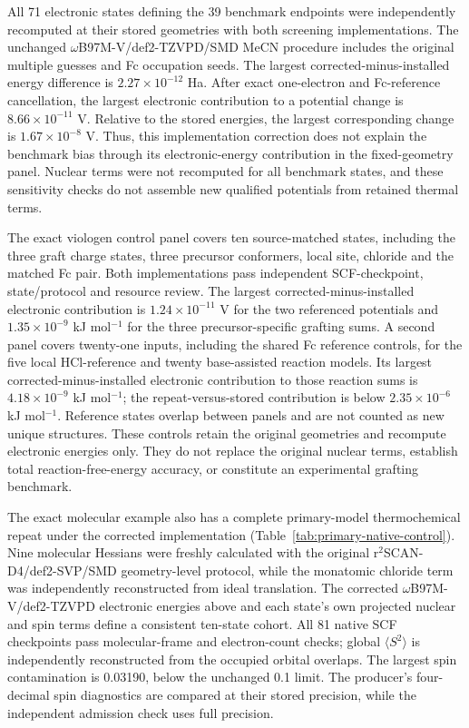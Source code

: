 \documentclass[11pt]{article}
\begin{document}
All 71 electronic states defining the 39 benchmark endpoints were independently recomputed at their stored geometries with both screening implementations. The unchanged $\omega$B97M-V/def2-TZVPD/SMD MeCN procedure includes the original multiple guesses and Fc occupation seeds. The largest corrected-minus-installed energy difference is $2.27\times10^{-12}$ Ha. After exact one-electron and Fc-reference cancellation, the largest electronic contribution to a potential change is $8.66\times10^{-11}$ V. Relative to the stored energies, the largest corresponding change is $1.67\times10^{-8}$ V. Thus, this implementation correction does not explain the benchmark bias through its electronic-energy contribution in the fixed-geometry panel. Nuclear terms were not recomputed for all benchmark states, and these sensitivity checks do not assemble new qualified potentials from retained thermal terms.

The exact viologen control panel covers ten source-matched states, including the three graft charge states, three precursor conformers, local site, chloride and the matched Fc pair. Both implementations pass independent SCF-checkpoint, state/protocol and resource review. The largest corrected-minus-installed electronic contribution is $1.24\times10^{-11}$ V for the two referenced potentials and $1.35\times10^{-9}$ kJ mol$^{-1}$ for the three precursor-specific grafting sums. A second panel covers twenty-one inputs, including the shared Fc reference controls, for the five local HCl-reference and twenty base-assisted reaction models. Its largest corrected-minus-installed electronic contribution to those reaction sums is $4.18\times10^{-9}$ kJ mol$^{-1}$; the repeat-versus-stored contribution is below $2.35\times10^{-6}$ kJ mol$^{-1}$. Reference states overlap between panels and are not counted as new unique structures. These controls retain the original geometries and recompute electronic energies only. They do not replace the original nuclear terms, establish total reaction-free-energy accuracy, or constitute an experimental grafting benchmark.

The exact molecular example also has a complete primary-model thermochemical repeat under the corrected implementation (Table~\ref{tab:primary-native-control}). Nine molecular Hessians were freshly calculated with the original r$^2$SCAN-D4/def2-SVP/SMD geometry-level protocol, while the monatomic chloride term was independently reconstructed from ideal translation. The corrected $\omega$B97M-V/def2-TZVPD electronic energies above and each state's own projected nuclear and spin terms define a consistent ten-state cohort. All 81 native SCF checkpoints pass molecular-frame and electron-count checks; global $\langle S^2\rangle$ is independently reconstructed from the occupied orbital overlaps. The largest spin contamination is 0.03190, below the unchanged 0.1 limit. The producer's four-decimal spin diagnostics are compared at their stored precision, while the independent admission check uses full precision.
\end{document}
